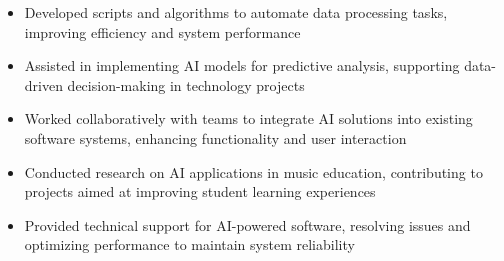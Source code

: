 \par\smallskip
\noindent
\begin{minipage}{20cm}
  \begin{minipage}{9.75cm}
    \begin{itemize}
      \item Developed scripts and algorithms to automate data processing tasks, improving efficiency and system performance
      \item Assisted in implementing AI models for predictive analysis, supporting data-driven decision-making in technology projects
      \item Worked collaboratively with teams to integrate AI solutions into existing software systems, enhancing functionality and user interaction
    \end{itemize}
  \end{minipage}
  \hfill
  \begin{minipage}{9.75cm}
    \begin{itemize}
      \item Conducted research on AI applications in music education, contributing to projects aimed at improving student learning experiences
      \item Provided technical support for AI-powered software, resolving issues and optimizing performance to maintain system reliability
    \end{itemize}
  \end{minipage}
\end{minipage}
\par\smallskip
\divider

